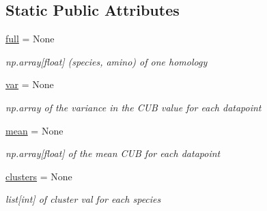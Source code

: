 \subsection*{Static Public Attributes}
\begin{DoxyCompactItemize}
\item 
\mbox{\label{class_py_c_u_b_1_1homology_1_1homology_a5220c03b38deb65d0e682bd1ad85802b}} 
\mbox{\hyperlink{class_py_c_u_b_1_1homology_1_1homology_a5220c03b38deb65d0e682bd1ad85802b}{full}} = None
\begin{DoxyCompactList}\small\item\em np.\+array\mbox{[}float\mbox{]} (species, amino) of one homology \end{DoxyCompactList}\item 
\mbox{\label{class_py_c_u_b_1_1homology_1_1homology_af6fbc0a12aaec1fd2c4e2231d8de5520}} 
\mbox{\hyperlink{class_py_c_u_b_1_1homology_1_1homology_af6fbc0a12aaec1fd2c4e2231d8de5520}{var}} = None
\begin{DoxyCompactList}\small\item\em np.\+array of the variance in the C\+UB value for each datapoint \end{DoxyCompactList}\item 
\mbox{\label{class_py_c_u_b_1_1homology_1_1homology_aabb8f64472865c658c9089b6d5ff51fd}} 
\mbox{\hyperlink{class_py_c_u_b_1_1homology_1_1homology_aabb8f64472865c658c9089b6d5ff51fd}{mean}} = None
\begin{DoxyCompactList}\small\item\em np.\+array\mbox{[}float\mbox{]} of the mean C\+UB for each datapoint \end{DoxyCompactList}\item 
\mbox{\label{class_py_c_u_b_1_1homology_1_1homology_acf7c487a7f77ef947afc193d36becd61}} 
\mbox{\hyperlink{class_py_c_u_b_1_1homology_1_1homology_acf7c487a7f77ef947afc193d36becd61}{clusters}} = None
\begin{DoxyCompactList}\small\item\em list\mbox{[}int\mbox{]} of cluster val for each species \end{DoxyCompactList}\item 
\mbox{\label{class_py_c_u_b_1_1homology_1_1homology_a7553f27ba7af2b61b973688bf1c72a7b}} 

\end{DoxyCompactItemize}
